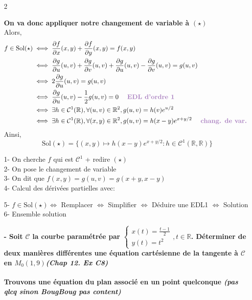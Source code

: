 \documentclass{article}
\newcommand{\formuleo}[1]{
  \begin{center}
    \tcbox[colframe=myorange, colback=white, boxrule=2pt, arc=6pt, boxsep=4pt]{
      #1
    }
  \end{center}
}
\newcommand{\R}[0]{
\mathbb{R}
}
\newcommand{\Sol}[0]{
\mathrm{Sol}
}
\newcommand{\xBox}[3]{
    \begin{thmbox}[M]{\textbf{#1}}
        #2\vspace*{5pt}
    \end{thmbox}\vspace*{-10pt}
    \hspace*{40pt} #3
}
\newcommand{\But}[1]{
\textbf{\textcolor{mypurple}{#1}}
}
\newcommand{\Question}[2]{
\noindent\textbf{- #1\hfill \emph{\textcolor{mygrayblue}{(#2)}}}
}
\begin{document}
{\begin{multicols}{2}
\end{multicols}
\noindent\But{On va donc appliquer notre changement de variable à $(\star)$}\\
Alors,
\begin{align*}
f \in \Sol (\star) &\iff  \dfrac{\partial f}{\partial x}(x,y)+\dfrac{\partial f}{\partial y}(x,y)=f(x,y)\\
&\iff \dfrac{\partial g}{\partial u}(u,v)+\dfrac{\partial g}{\partial v}(u,v)+\dfrac{\partial g}{\partial u}(u,v)-\dfrac{\partial g}{\partial v}(u,v)=g(u,v)\\
&\iff 2\dfrac{\partial g}{\partial u}(u,v) = g(u,v)\\
&\iff \dfrac{\partial g}{\partial u}(u,v)- \dfrac{1}{2} g(u,v)=0 \quad \text{\But{EDL d'ordre 1}}\\
&\iff \exists h \in \mathcal{C}^1 (\R ), \forall (u,v) \in \R^2, g(u,v)=h(v)e^{u/2}\\
&\iff \exists h \in \mathcal{C}^1 (\R ), \forall (x,y) \in \R^2, g(u,v)=h(x-y)e^{x+y/2} \quad \text{\But{chang. de var.}}
\end{align*}
\noindent Ainsi,\\
$$\Sol(\star)=\{(x,y) \mapsto h(x-y)e^{x+y/2} : h\in \mathcal{C}^1(\R,\R)\}$$\vfill
\begin{méthode}{}
1- On cherche $f$ qui est $\mathcal{C}^1$ + redire $(\star)$\\
2- On pose le changement de variable\\
3- On dit que $f(x,y)=g(u,v)=g(x+y,x-y)$\\
4- Calcul des dérivées partielles avec:
\formuleo{$\dfrac{\partial f}{\partial x}=\dfrac{\partial g}{\partial u}\dfrac{\partial u}{\partial x}+\dfrac{\partial g}{\partial v}\dfrac{\partial v}{\partial u}$}
5- $f \in \Sol (\star) \iff$ Remplacer $\iff$ Simplifier $\iff$ Déduire une EDL1 $\iff$ Solution\\
6- Ensemble solution
\end{méthode}\pagebreak
\Question{Soit $\mathscr{C}$ la courbe paramétrée par $\left\{\begin{matrix}x(t)=\frac{t-1}{2}\\y(t)=t^2\end{matrix}\right. ,t\in\R$. Déterminer de deux manières différentes une équation cartésienne de la tangente à $\mathscr{C}$ en $M_0(1,9)$}{Chap 12. Ex C8}\\\\
\But{Trouvons une équation du plan associé en un point quelconque \textit{(pas qlcq sinon BougBoug pas content)}}
}
\end{document}
